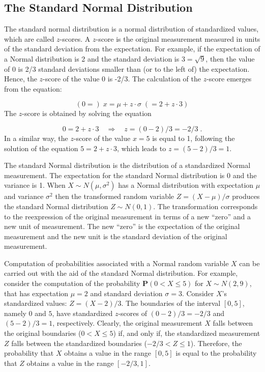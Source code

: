 \documentclass[
]{krantz}
\newcommand{\Prob}{\mathbf{P}}
\theoremstyle{definition}
\theoremstyle{definition}
\theoremstyle{definition}
\theoremstyle{remark}
\begin{document}
\hypertarget{the-standard-normal-distribution}{%
\subsection{The Standard Normal Distribution}\label{the-standard-normal-distribution}}

The standard normal distribution is a normal distribution of
standardized values, which are called \(z\)-scores. A \(z\)-score is the
original measurement measured in units of the standard deviation from
the expectation. For example, if the expectation of a Normal
distribution is 2 and the standard deviation is \(3 = \sqrt{9}\), then the
value of 0 is 2/3 standard deviations smaller than (or to the left of)
the expectation. Hence, the \(z\)-score of the value 0 is -2/3. The
calculation of the \(z\)-score emerges from the equation:

\[(0 =)\; x = \mu + z \cdot \sigma\; (= 2 + z \cdot 3)\] The \(z\)-score
is obtained by solving the equation

\[0 = 2 + z \cdot 3 \quad \Longrightarrow \quad z = (0-2)/3 = -2/3\;.\]
In a similar way, the \(z\)-score of the value \(x = 5\) is equal to 1,
following the solution of the equation \(5 = 2 + z\cdot 3\), which leads
to \(z = (5-2)/3 = 1\).

The standard Normal distribution is the distribution of a standardized
Normal measurement. The expectation for the standard Normal distribution
is 0 and the variance is 1. When \(X \sim N(\mu,\sigma^2)\) has a Normal
distribution with expectation \(\mu\) and variance \(\sigma^2\) then the
transformed random variable \(Z = (X-\mu)/\sigma\) produces the standard
Normal distribution \(Z\sim N(0,1)\). The transformation corresponds to
the reexpression of the original measurement in terms of a new ``zero''
and a new unit of measurement. The new ``zero'' is the expectation of the
original measurement and the new unit is the standard deviation of the
original measurement.

Computation of probabilities associated with a Normal random variable
\(X\) can be carried out with the aid of the standard Normal distribution.
For example, consider the computation of the probability
\(\Prob(0 < X \leq 5)\) for \(X \sim N(2, 9)\), that has expectation \(\mu=2\)
and standard deviation \(\sigma = 3\). Consider \(X\)'s standardized values:
\(Z = (X-2)/3\). The boundaries of the interval \([0,5]\), namely \(0\) and
\(5\), have standardized \(z\)-scores of \((0-2)/3=-2/3\) and \((5-2)/3 =1\),
respectively. Clearly, the original measurement \(X\) falls between the
original boundaries (\(0 < X \leq 5\)) if, and only if, the standardized
measurement \(Z\) falls between the standardized boundaries
(\(-2/3 < Z \leq 1\)). Therefore, the probability that \(X\) obtains a value
in the range \([0,5]\) is equal to the probability that \(Z\) obtains a
value in the range \([-2/3,1]\).
\end{document}
